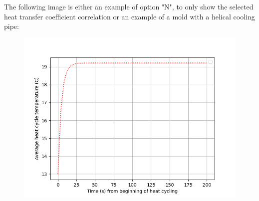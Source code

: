 \documentclass[a4paper,12pt]{article}
\begin{document}
\clearpage

The following image is either an example of option "N", to only show the selected heat transfer coefficient correlation or an example of a mold with a helical cooling pipe:

\begin{center}
\begin{figure}[h]
\centering
\includegraphics{tutorialimage6.png}
\end{figure}
\end{center}
\end{document}
